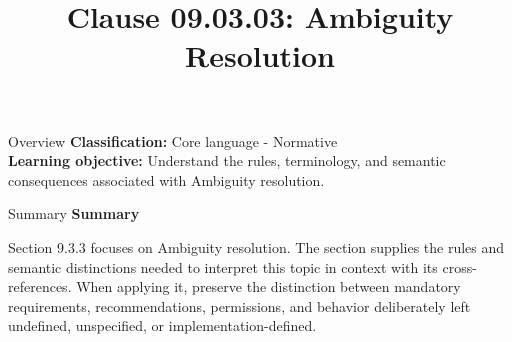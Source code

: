 \documentclass[10pt,letterpaper]{article}
\title{Clause 09.03.03: Ambiguity Resolution}
\author{}
\date{}
\begin{document}
\maketitle
\begin{CornellOverviewBox}{Overview}
\textbf{Classification:} Core language - Normative\\[2pt]
\textbf{Learning objective:} Understand the rules, terminology, and semantic consequences associated with Ambiguity resolution.
\end{CornellOverviewBox}\begin{CornellSummaryBox}{Summary}
{\sffamily\bfseries\color{Accent} Summary}\par\vspace{3pt}Section 9.3.3 focuses on Ambiguity resolution. The section supplies the rules and semantic distinctions needed to interpret this topic in context with its cross-references. When applying it, preserve the distinction between mandatory requirements, recommendations, permissions, and behavior deliberately left undefined, unspecified, or implementation-defined.
\end{CornellSummaryBox}
\end{document}
